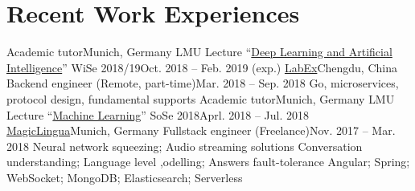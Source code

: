 \section{\textbf{Recent Work Experiences}}
  \resumeSubHeadingListStart
    \resumeSubheading
      {Academic tutor}{Munich, Germany}
      {LMU Lecture ``\href{http://www.dbs.ifi.lmu.de/cms/studium_lehre/lehre_master/deep1819/index.html}{Deep Learning and Artificial Intelligence}'' WiSe 2018/19}{Oct. 2018 -- Feb. 2019 (exp.)}
      \resumeItemListStart
      \resumeItemListEnd
    \resumeSubheading
      {\href{https://labex.io/}{LabEx}}{Chengdu, China}
      {Backend engineer (Remote, part-time)}{Mar. 2018 -- Sep. 2018}
      \resumeItemListStart
          {Go, microservices, protocol design, fundamental supports}
      \resumeItemListEnd
    \resumeSubheading
      {Academic tutor}{Munich, Germany}
      {LMU Lecture ``\href{http://www.dbs.ifi.lmu.de/cms/studium_lehre/lehre_master/ml18/index.html}{Machine Learning}'' SoSe 2018}{Aprl. 2018 -- Jul. 2018}
      \resumeItemListStart
      \resumeItemListEnd
    \resumeSubheading
    {\href{https://magiclingua.com/}{MagicLingua}}{Munich, Germany}
    {Fullstack engineer (Freelance)}{Nov. 2017 -- Mar. 2018}
    \resumeItemListStart
        {Neural network squeezing; Audio streaming solutions}
        {Conversation understanding; Language level ,odelling; Answers fault-tolerance}
        {Angular; Spring; WebSocket; MongoDB; Elasticsearch; Serverless}
    \resumeItemListEnd
  \resumeSubHeadingListEnd